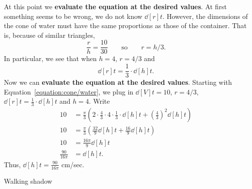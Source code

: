 \documentclass{ximera}
\begin{document}
\begin{example}
\begin{explanation}
At this point we \textbf{evaluate the equation at the desired values}.
At first something seems to be wrong, we do not know $\dd[r]{t}$.
However, the dimensions of the cone of water must have the same
proportions as those of the container.  That is, because of similar
triangles, 
\[
\frac{r}{h}=\frac{10}{30} \qquad\text{so}\qquad r={h/3}.
\]  
In particular, we see that when $h = 4$, $r=4/3$ and 
\[
\dd[r]{t} = \frac{1}{3}\cdot \dd[h]{t}.
\]
Now we can \textbf{evaluate the equation at the desired
  values}. Starting with Equation~\ref{equation:cone/water}, we plug
in $\dd[V]{t} = 10$, $r = 4/3$, $\dd[r]{t} = \frac{1}{3}\cdot \dd[h]{t}$
and $h=4$. Write
\begin{align*}
10 &= \frac{\pi}{3}\left(2\cdot \frac{4}{3}\cdot 4 \cdot\frac{1}{3}\cdot\dd[h]{t} + \left(\frac{4}{3}\right)^2 \dd[h]{t}\right)\\
10 &= \frac{\pi}{3}\left(\frac{32}{9}\dd[h]{t} + \frac{16}{9} \dd[h]{t}\right)\\
10 &= \frac{16\pi}{9}\dd[h]{t}\\
\frac{90}{16\pi} &= \dd[h]{t}.
\end{align*}
Thus, $\dd[h]{t}=\frac{90}{16\pi}$ cm/sec.
\end{explanation}
\end{example}


Walking shadow
\end{document}
